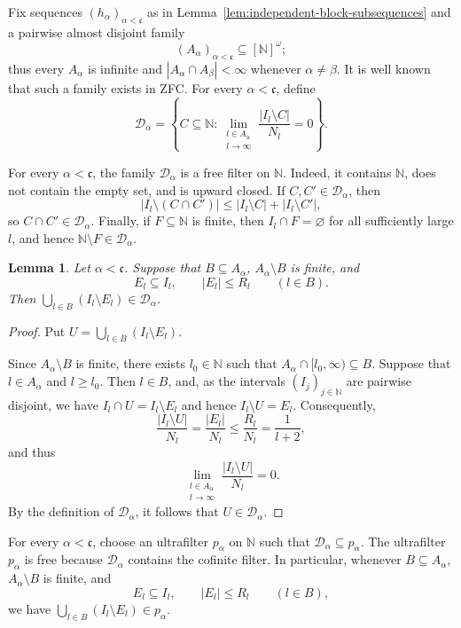\documentclass[11pt]{amsart}
\newtheorem{lemma}[theorem]{Lemma}
\theoremstyle{definition}
\newcommand{\N}{\mathbb N}
\newcommand{\cfrak}{\mathfrak c}
\begin{document}
Fix sequences $(h_\alpha)_{\alpha<\cfrak}$ as in
Lemma~\ref{lem:independent-block-subsequences} and a pairwise almost disjoint
family
\[
 (A_\alpha)_{\alpha<\cfrak}\subseteq[\N]^\omega;
\]
thus every $A_\alpha$ is infinite and
$|A_\alpha\cap A_\beta|<\infty$ whenever $\alpha\neq\beta$.  It is well known that such a family
exists in ZFC.  For every
$\alpha<\cfrak$, define
\[
\mathscr D_\alpha
=
\left\{
C\subseteq\N:
\lim_{\substack{l\in A_\alpha\\l\to\infty}}
\frac{|I_l\setminus C|}{N_l}=0
\right\}.
\]

For every $\alpha<\cfrak$, the family $\mathscr D_\alpha$ is a free filter on
$\N$.  Indeed, it contains $\N$, does not contain the empty set, and is upward
closed.  If $C,C'\in\mathscr D_\alpha$, then
\[
 |I_l\setminus(C\cap C')|
 \leq |I_l\setminus C|+|I_l\setminus C'|,
\]
so $C\cap C'\in\mathscr D_\alpha$.  Finally, if $F\subseteq\N$ is finite,
then $I_l\cap F=\varnothing$ for all sufficiently large $l$, and hence
$\N\setminus F\in\mathscr D_\alpha$.

\begin{lemma}\label{lem:block-filters}
Let $\alpha<\cfrak$.  Suppose that $B\subseteq A_\alpha$,
$A_\alpha\setminus B$ is finite, and
\[
E_l\subseteq I_l,
\qquad
|E_l|\leq R_l
\qquad(l\in B).
\]
Then $\displaystyle \bigcup_{l\in B}(I_l\setminus E_l)
\in\mathscr D_\alpha$.
\end{lemma}

\begin{proof}
Put $\displaystyle U
=
\bigcup_{l\in B}(I_l\setminus E_l)$.

Since $A_\alpha\setminus B$ is finite, there exists $l_0\in\N$ such
that $A_\alpha\cap[l_0,\infty)\subseteq B$.  Suppose that $l\in A_\alpha$
and $l\geq l_0$.  Then $l\in B$, and, as the intervals
$(I_j)_{j\in\N}$ are pairwise disjoint, we have
$I_l\cap U=I_l\setminus E_l$ and hence $I_l\setminus U=E_l$.
Consequently,
\[
\frac{|I_{l}\setminus U|}{N_{l}}
=
\frac{|E_{l}|}{N_{l}}
\leq
\frac{R_{l}}{N_{l}}
=
\frac{1}{l+2},
\]
and thus
\[
\lim_{\substack{l\in A_\alpha\\l\to\infty}}
\frac{|I_l\setminus U|}{N_l}=0.
\]
By the definition of $\mathscr D_\alpha$, it follows that
$U\in\mathscr D_\alpha$.
\end{proof}

For every $\alpha<\cfrak$, choose an ultrafilter $p_\alpha$ on $\N$
such that $\mathscr D_\alpha\subseteq p_\alpha$.
The ultrafilter $p_\alpha$ is free because $\mathscr D_\alpha$ contains the
cofinite filter.
In particular, whenever $B\subseteq A_\alpha$,
$A_\alpha\setminus B$ is finite, and
\[
E_l\subseteq I_l,
\qquad
|E_l|\leq R_l
\qquad(l\in B),
\]
we have $\bigcup_{l\in B}(I_l\setminus E_l)
\in p_\alpha$.
\end{document}
